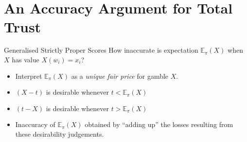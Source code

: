 \documentclass[aspectratio=169, dvipsnames]{beamer}
\newcommand{\E}{\mathbb{E}}
\newcommand{\W}{\mathcal{W}}
\begin{document}


\section{An Accuracy Argument for Total Trust}

\begin{frame}{Generalised Strictly Proper Scores}
  How inaccurate is expectation $\E_{\pi}(X)$ when $X$ has value $X(w_i) = x_i$?
  \begin{itemize}
  \item Interpret $\E_{\pi}(X)$ as a \textit{unique fair price} for gamble $X$.
  \item $(X - t)$ is desirable whenever $t < \E_{\pi}(X)$
  \item $(t - X)$ is desirable whenever $t > \E_{\pi}(X)$
  \item Inaccuracy of $\E_{\pi}(X)$ obtained by ``adding up'' the losses resulting from these desirability judgements. 
  \end{itemize}
\end{frame}

\end{document}
